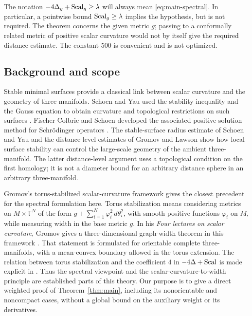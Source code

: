 The notation $-4\Delta_g+\operatorname{Scal}_g\ge\lambda$ will always mean
\eqref{eq:main-spectral}. In particular, a pointwise bound
$\operatorname{Scal}_g\ge\lambda$ implies the hypothesis, but is not required.
The theorem concerns the given metric $g$; passing to a conformally
related metric of positive scalar curvature would not by itself give
the required distance estimate. The constant $500$ is convenient and
is not optimized.

\subsection{Background and scope}

Stable minimal surfaces provide a classical link between scalar
curvature and the geometry of three-manifolds. Schoen and Yau used the
stability inequality and the Gauss equation to obtain curvature and
topological restrictions on such surfaces \cite{SchoenYau1979}.
Fischer-Colbrie and Schoen developed the associated positive-solution
method for Schr\"odinger operators \cite{FischerColbrieSchoen1980}.
The stable-surface radius estimate of Schoen and Yau
\cite{SchoenYau1983} and the distance-level estimates of Gromov and
Lawson \cite[Section~10]{GromovLawson1983} show how local surface
stability can control the large-scale geometry of the ambient
three-manifold. The latter distance-level argument uses a topological
condition on the first homology; it is not a diameter bound for an
arbitrary distance sphere in an arbitrary three-manifold.

Gromov's torus-stabilized scalar-curvature framework gives the closest
precedent for the spectral formulation here. Torus stabilization means
considering metrics on $M\times\mathbb T^N$ of the form
$g+\sum_{i=1}^N\varphi_i^2\,d\theta_i^2$, with smooth positive
functions $\varphi_i$ on $M$, while measuring width in the base metric
$g$. In his \emph{Four lectures on scalar curvature}, Gromov gives a
three-dimensional graph-width theorem in this framework
\cite[Section~3.10.1, Theorem~(G)]{GromovFourLectures2023}.
That statement is formulated for orientable complete three-manifolds,
with a mean-convex boundary allowed in the torus extension. The relation between torus
stabilization and the coefficient $4$ in
$-4\Delta+\operatorname{Scal}$ is made explicit in
\cite[Sections~1.A--1.B]{GromovStabilized2024}. Thus the spectral
viewpoint and the scalar-curvature-to-width principle are established
parts of this theory. Our purpose is to give a direct weighted proof
of Theorem~\ref{thm:main}, including its nonorientable and noncompact
cases, without a global bound on the auxiliary weight or its derivatives.

